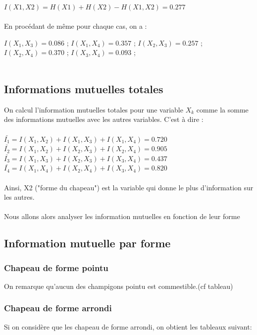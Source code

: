 \documentclass{article}
\begin{document}
    $I(X1,X2)=H(X1)+H(X2)-H(X1,X2)=0.277$
    \\
    \\
    En procédant de même pour chaque cas, on a :

    $I(X_1,X_3)=0.086$ ;
    $I(X_1,X_4)=0.357$ ;
    $I(X_2,X_3)=0.257$ ;
    $I(X_2,X_4)=0.370$ ;
    $I(X_3,X_4)=0.093$ ;
    \\
    \\

    \subsection{Informations mutuelles totales}
    On calcul l'information mutuelles totales pour une variable $X_k$ comme 
    la somme des informations mutuelles avec les autres variables. C'est à dire :
    \\
    \\
    $\bar{I_1}=I(X_1,X_2) + I(X_1,X_3) + I(X_1,X_4) = 0.720 $ 
    \\
    $\bar{I_2}=I(X_1,X_2) + I(X_2,X_3) + I(X_2,X_4) = 0.905 $
    \\
    $\bar{I_3}=I(X_1,X_3) + I(X_2,X_3) + I(X_3,X_4) = 0.437$
    \\
    $\bar{I_4}=I(X_1,X_4) + I(X_2,X_4) + I(X_3,X_4) = 0.820$
    \\
    \\
    Ainsi, X2 ("forme du chapeau") est la variable qui donne le plus d'information sur les autres.
    \\
    \\
    Nous allons alors analyser les information mutuelles en fonction de leur forme

    \subsection{Information mutuelle par forme}

    \subsubsection{Chapeau de forme pointu}
      On remarque qu'aucun des champigons pointu est commestible.(cf tableau)

\subsubsection{Chapeau de forme arrondi}

Si on considère que les chapeau de forme arrondi, on obtient les tableaux suivant: 
\end{document}
